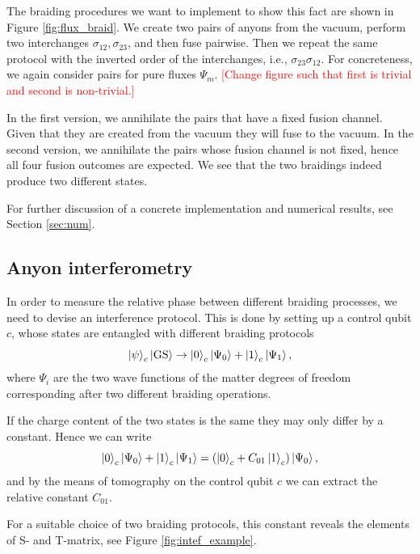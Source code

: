 \documentclass[two column]{article}
\newcommand{\caro}[1]{\textcolor{red}{[#1]}}
\begin{document}
The braiding procedures we want to implement to show this fact are shown in Figure \ref{fig:flux_braid}. We create two pairs of anyons from the vacuum, perform two interchanges $\sigma_{12}, \sigma_{23}$, and then fuse pairwise. Then we repeat the same protocol with the inverted order of the interchanges, i.e., $\sigma_{23} \sigma_{12}$. For concreteness, we again consider pairs for pure fluxes $\Psi_m$. 
\caro{Change figure such that first is trivial and second is non-trivial.}


In the first version, we annihilate the pairs that have a fixed fusion channel. Given that they are created from the vacuum they will fuse to the vacuum.
In the second version, we annihilate the pairs whose fusion channel is not fixed, hence all four fusion outcomes are expected. We see that the two braidings indeed produce two different states. 

For further discussion of a concrete implementation and numerical results, see Section \ref{sec:num}.

\subsection{Anyon interferometry}\label{subsec:Intef}




In order to measure the relative phase between different braiding processes, we need to devise an interference protocol. This is done by setting up a control qubit $c$, whose states are entangled with different braiding protocols
\begin{equation}
    \ket{\psi}_c\ket{\text{GS}} \rightarrow \ket{0}_c \ket{\Psi_0} + \ket{1}_c \ket{\Psi_1},
\end{equation}
where $\Psi_i$ are the two wave functions of the matter degrees of freedom corresponding after two different braiding operations.

If the charge content of the two states is the same they may only differ by a constant. Hence we can write
\begin{equation}
    \ket{0}_c \ket{\Psi_0} + \ket{1}_c \ket{\Psi_1} = (\ket{0}_c + C_{01}\ket{1}_c)\ket{\Psi_0},
\end{equation}
and by the means of tomography on the control qubit $c$ we can extract the relative constant $C_{01}$.

For a suitable choice of two braiding protocols, this constant reveals the elements of S- and T-matrix, see Figure \ref{fig:intef_example}.
\end{document}
